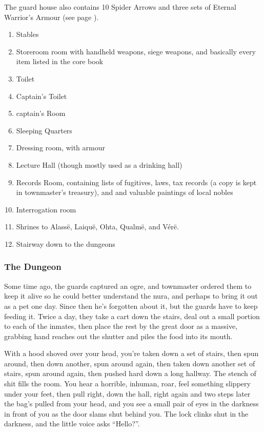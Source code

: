 \begin{multicols}{2}
The guard house also contains 10 Spider Arrows and three sets of Eternal Warrior's Armour (see page \pageref{eternalwarriorarmour}).

\noindent

\begin{enumerate}

	\item{Stables}
	\item{Storeroom room with handheld weapons, siege weapons, and basically every item listed in the core book}
	\item{Toilet}
	\item{Captain's Toilet}
	\item{\gls{captain}'s Room}
	\item{Sleeping Quarters}
	\item{Dressing room, with armour}
	\item{Lecture Hall (though mostly used as a drinking hall)}
	\item{Records Room, containing lists of fugitives, laws, tax records (a copy is kept in \gls{townmaster}'s treasury), and and valuable paintings of local nobles}
	\item{Interrogation room}
	\item{Shrines to Alass\"{e}, Laiqu\"{e}, Ohta, Qualm\"{e}, and V\'{e}r\"{e}.}
	\item{Stairway down to the dungeons}
\end{enumerate}

\subsubsection{The Dungeon}

Some time ago, the guards captured an ogre, and \gls{townmaster} ordered them to keep it alive so he could better understand the nura, and perhaps to bring it out as a pet one day.  Since then he's forgotten about it, but the guards have to keep feeding it.  Twice a day, they take a cart down the stairs, deal out a small portion to each of the inmates, then place the rest by the great door as a massive, grabbing hand reaches out the shutter and piles the food into its mouth.

\begin{boxtext}

	With a hood shoved over your head, you're taken down a set of stairs, then spun around, then down another, spun around again, then taken down another set of stairs, spun around again, then pushed hard down a long hallway.
	 The stench of shit fills the room.
	 You hear a horrible, inhuman, roar, feel something slippery under your feet, then pull right, down the hall, right again and two steps later the bag's pulled from your head, and you see a small pair of eyes in the darkness in front of you as the door slams shut behind you.
	 The lock clinks shut in the darkness, and the little voice asks ``Hello?''.


\end{boxtext}
\end{multicols}
